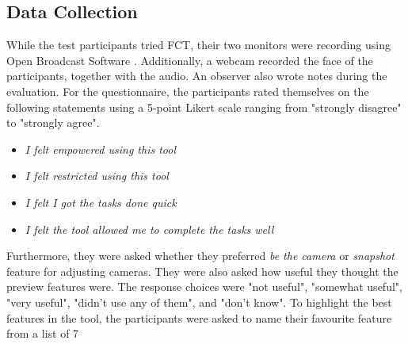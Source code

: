 \subsection{Data Collection}
While the test participants tried FCT, their two monitors were recording using Open Broadcast Software \cite{obs_cam}. Additionally, a webcam recorded the face of the participants, together with the audio. An observer also wrote notes during the evaluation. For the questionnaire, the participants rated themselves on the following statements using a 5-point Likert scale ranging from "strongly disagree" to "strongly agree". 
\begin{itemize}[noitemsep,nolistsep]
\item \textit{I felt empowered using this tool}
\item \textit{I felt restricted using this tool}
\item \textit{I felt I got the tasks done quick}
\item \textit{I felt the tool allowed me to complete the tasks well}
\end{itemize}
Furthermore, they were asked whether they preferred \textit{be the camera} or \textit{snapshot} feature for adjusting cameras. They were also asked how useful they thought the preview features were. The response choices were "not useful", "somewhat useful", "very useful", "didn't use any of them", and "don't know". To highlight the best features in the tool, the participants were asked to name their favourite feature from a list of 7
